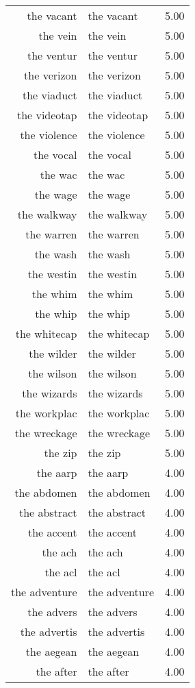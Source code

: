 \begin{table}[ht]
\begin{tabular}{rlr}
  the vacant & the vacant & 5.00 \\ 
  the vein & the vein & 5.00 \\ 
  the ventur & the ventur & 5.00 \\ 
  the verizon & the verizon & 5.00 \\ 
  the viaduct & the viaduct & 5.00 \\ 
  the videotap & the videotap & 5.00 \\ 
  the violence & the violence & 5.00 \\ 
  the vocal & the vocal & 5.00 \\ 
  the wac & the wac & 5.00 \\ 
  the wage & the wage & 5.00 \\ 
  the walkway & the walkway & 5.00 \\ 
  the warren & the warren & 5.00 \\ 
  the wash & the wash & 5.00 \\ 
  the westin & the westin & 5.00 \\ 
  the whim & the whim & 5.00 \\ 
  the whip & the whip & 5.00 \\ 
  the whitecap & the whitecap & 5.00 \\ 
  the wilder & the wilder & 5.00 \\ 
  the wilson & the wilson & 5.00 \\ 
  the wizards & the wizards & 5.00 \\ 
  the workplac & the workplac & 5.00 \\ 
  the wreckage & the wreckage & 5.00 \\ 
  the zip & the zip & 5.00 \\ 
  the aarp & the aarp & 4.00 \\ 
  the abdomen & the abdomen & 4.00 \\ 
  the abstract & the abstract & 4.00 \\ 
  the accent & the accent & 4.00 \\ 
  the ach & the ach & 4.00 \\ 
  the acl & the acl & 4.00 \\ 
  the adventure & the adventure & 4.00 \\ 
  the advers & the advers & 4.00 \\ 
  the advertis & the advertis & 4.00 \\ 
  the aegean & the aegean & 4.00 \\ 
  the after & the after & 4.00 \\ 

\end{tabular}
\end{table}
